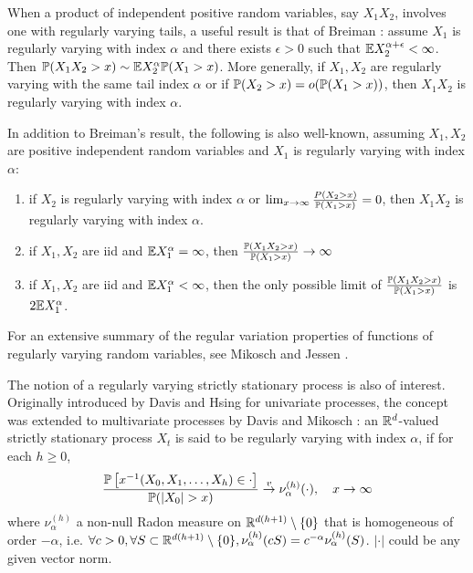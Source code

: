 When a product of independent positive random variables, say $X_1
X_2$, involves one with regularly varying tails, a useful result is
that of Breiman \cite{breiman:1965}: assume $X_1$ is regularly varying
with index $\alpha$ and there exists $\epsilon > 0$ such that
$\E X_2^{\alpha + \epsilon} < \infty$.
Then $\P(X_1 X_2 > x) \sim \E X_2^{\alpha} \P(X_1 > x)$.
More generally, if $X_1, X_2$ are regularly varying with the same tail
index $\alpha$ or if $\P(X_2 > x) = o(\P(X_1 > x))$, then $X_1 X_2$ is
regularly varying with index $\alpha$.

In addition to Breiman's result, the following is also well-known,
assuming $X_1, X_2$ are positive independent random variables and
$X_1$ is regularly varying with index $\alpha$:
\begin{enumerate}
\item if $X_2$ is regularly varying with index $\alpha$ or
  $\lim_{x \to \infty} {P(X_2 > x) \over \P(X_1 > x)} = 0$, then $X_1
  X_2$ is regularly varying with index $\alpha$.
\item if $X_1, X_2$ are iid and $\E X_1^\alpha = \infty$, then
  ${\P(X_1 X_2 > x) \over \P(X_1 > x)} \to \infty$
\item if $X_1, X_2$ are iid and $\E X_1^\alpha < \infty$, then the
  only possible limit of ${\P(X_1 X_2 > x) \over \P(X_1 > x)}$ is
  $2 \E X_1^\alpha$.
\end{enumerate}
For an extensive summary of the regular variation properties of
functions of regularly varying random variables, see Mikosch and
Jessen \cite{jessen:mikosch:2006}.

The notion of a regularly varying strictly stationary process is also of
interest. Originally introduced by Davis and Hsing
\cite{davis:hsing:1995} for univariate processes, the concept was
extended to multivariate processes by Davis and Mikosch
\cite{davis:mikosch:2009b}: an $\reals^d$-valued strictly stationary
process $X_t$ is said to be regularly varying with index $\alpha$, if
for each $h \geq 0$, 
\[
  {
    \P\left[x^{-1}(X_0, X_1, \dots, X_h) \in \cdot \right]
    \over
    \P(|X_0| > x)
  } \overset{v}{\to} \nu^{(h)}_\alpha(\cdot),
  \quad x \to \infty
\]
where $\nu_\alpha^{(h)}$ a non-null Radon measure on
$\reals^{d(h+1)} \setminus \{0\}$ that
is homogeneous of order $-\alpha$, i.e.
$\forall c > 0, \forall S \subset \reals^{d(h+1)}\setminus\{0\}, \nu_\alpha^{(h)}(c S) = c^{-\alpha} \nu_\alpha^{(h)}(S)$. $|\cdot|$ could be any given vector norm.

